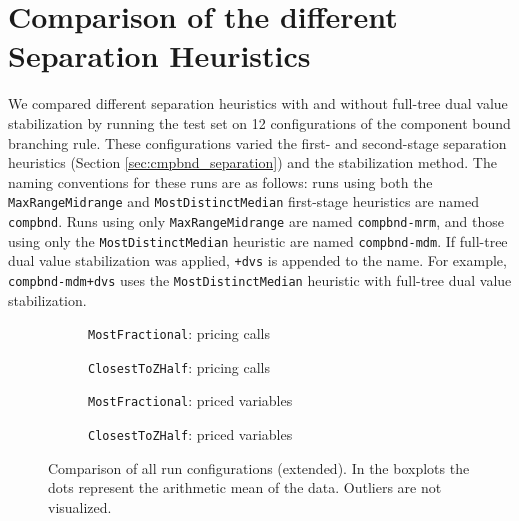 \section{Comparison of the different Separation Heuristics}\label{sec:evaluation_comparison_separation}
We compared different separation heuristics with and without full-tree dual value stabilization by running the test set on 12 configurations of the component bound branching rule. These configurations varied the first- and second-stage separation heuristics (Section \ref{sec:cmpbnd_separation}) and the stabilization method. The naming conventions for these runs are as follows: runs using both the \texttt{MaxRangeMidrange} and \texttt{MostDistinctMedian} first-stage heuristics are named \texttt{compbnd}. Runs using only \texttt{MaxRangeMidrange} are named \texttt{compbnd-mrm}, and those using only the \texttt{MostDistinctMedian} heuristic are named \texttt{compbnd-mdm}. If full-tree dual value stabilization was applied, \texttt{+dvs} is appended to the name. For example, \texttt{compbnd-mdm+dvs} uses the \texttt{MostDistinctMedian} heuristic with full-tree dual value stabilization.

\begin{figure}
	\centering

	\begin{subfigure}{0.495\textwidth}
		\centering
		
		\caption{\texttt{MostFractional}: pricing calls}
		\label{fig:mostfractional_pricing_calls}
	\end{subfigure}
	\hfill
	\begin{subfigure}{0.495\textwidth}
		\centering
		
		\caption{\texttt{ClosestToZHalf}: pricing calls}
		\label{fig:closesttozhalf_pricing_calls}
	\end{subfigure}

	\vspace{1em}

	\begin{subfigure}{0.495\textwidth}
		\centering
		
		\caption{\texttt{MostFractional}: priced variables}
		\label{fig:mostfractional_pricing_vars}
	\end{subfigure}
	\hfill
	\begin{subfigure}{0.495\textwidth}
		\centering
		
		\caption{\texttt{ClosestToZHalf}: priced variables}
		\label{fig:closesttozhalf_pricing_vars}
	\end{subfigure}

	\caption{Comparison of all run configurations (extended). In the boxplots the dots represent the arithmetic mean of the data. Outliers are not visualized.}
	\label{fig:comparison_general_extra}
\end{figure}

